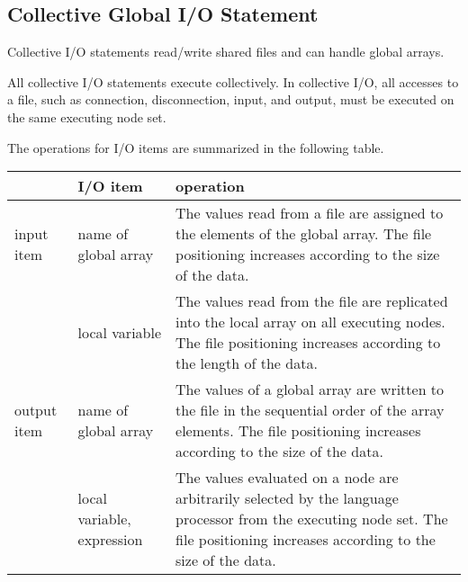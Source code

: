    
   \subsection{Collective Global I/O Statement}

   Collective I/O statements read/write shared files and can handle global arrays.

   All collective I/O statements execute collectively.
   In collective I/O, all accesses to a file, such as connection, disconnection,
   input, and output, must be executed on the same executing node set. 
   
   The operations for I/O items are summarized in the following table.

   \begin{table}[h]
    \begin{center}
     \begin{tabular}{|p{10mm}|l|p{100mm}|}
      \hline
      \multicolumn{1}{|c}{ }  & {\bf I/O item} & {\bf operation} \\ \hline
      input item & name of global array & The values read from a file are assigned to the elements of the global array.
      The file positioning increases according to the size of the data.
      \\ \cline{2-3}
      & local variable &  The values read from the file are replicated into the
	      local array on all executing nodes. The file positioning increases according to
	      the length of the data.
      \\ \hline
      output item & name of global array & The values of a global array are
      written to the file in the sequential order of the array elements.
      The file positioning increases according to the size of the data.
      \\ \cline{2-3}
      & local variable, expression & The values evaluated on a node
			   are arbitrarily selected by the language processor from the
			   executing node set.
      The file positioning increases according to the size of the data.
      \\ \hline
      \end{tabular}
     \end{center}
   \end{table}

   
